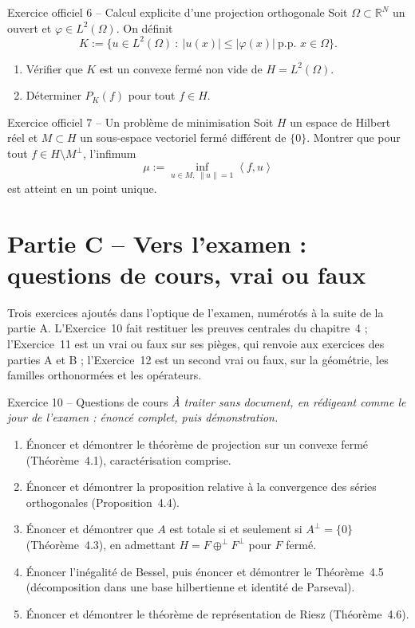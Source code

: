 \documentclass[11pt,a4paper]{article}
\newcommand{\R}{\mathbb{R}}
\newcommand{\norm}[1]{\left\|#1\right\|}
\newcommand{\ps}[2]{\left\langle #1,#2\right\rangle}
\theoremstyle{definition}
\begin{document}
\begin{exo}{Exercice officiel 6 -- Calcul explicite d'une projection orthogonale}
Soit $\Omega\subset\R^N$ un ouvert et $\varphi\in L^2(\Omega)$. On définit
\[
K:=\{u\in L^2(\Omega)\ :\ |u(x)|\le|\varphi(x)|\ \text{p.p.\ }x\in\Omega\}.
\]
\begin{enumerate}[label=(\alph*)]
  \item Vérifier que $K$ est un convexe fermé non vide de $H=L^2(\Omega)$.
  \item Déterminer $P_K(f)$ pour tout $f\in H$.
\end{enumerate}
\end{exo}

\begin{exo}{Exercice officiel 7 -- Un problème de minimisation}
Soit $H$ un espace de Hilbert réel et $M\subset H$ un sous-espace vectoriel fermé différent de $\{0\}$. Montrer que pour tout $f\in H\setminus M^\perp$, l'infimum
\[
\mu:=\inf_{u\in M,\ \norm u=1}\ps fu
\]
est atteint en un point unique.
\end{exo}

\section*{Partie C -- Vers l'examen : questions de cours, vrai ou faux}

\begin{commentaire}
Trois exercices ajoutés dans l'optique de l'examen, numérotés à la suite de la partie A. L'Exercice~10 fait restituer les preuves centrales du chapitre~4 ; l'Exercice~11 est un vrai ou faux sur ses pièges, qui renvoie aux exercices des parties A et B ; l'Exercice~12 est un second vrai ou faux, sur la géométrie, les familles orthonormées et les opérateurs.
\end{commentaire}

\begin{exo}{Exercice 10 -- Questions de cours}
\emph{À traiter sans document, en rédigeant comme le jour de l'examen : énoncé complet, puis démonstration.}
\begin{enumerate}[label=(\alph*)]
  \item Énoncer et démontrer le théorème de projection sur un convexe fermé (Théorème~4.1), caractérisation comprise.
  \item Énoncer et démontrer la proposition relative à la convergence des séries orthogonales (Proposition~4.4).
  \item Énoncer et démontrer que $A$ est totale si et seulement si $A^\perp=\{0\}$ (Théorème~4.3), en admettant $H=F\oplus^\perp F^\perp$ pour $F$ fermé.
  \item Énoncer l'inégalité de Bessel, puis énoncer et démontrer le Théorème~4.5 (décomposition dans une base hilbertienne et identité de Parseval).
  \item Énoncer et démontrer le théorème de représentation de Riesz (Théorème~4.6).
\end{enumerate}
\end{exo}
\end{document}
